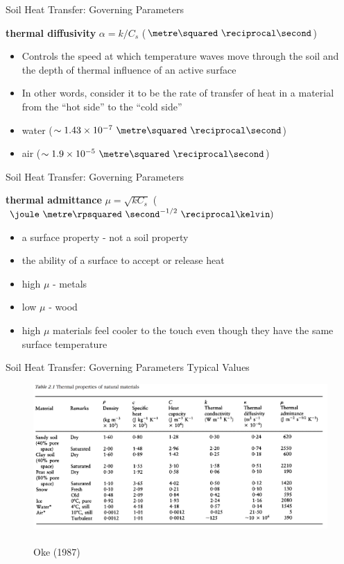 \begin{frame}{Soil Heat Transfer: Governing Parameters}

{\large \textbf{thermal diffusivity } $\alpha = k/C_s$ ($\metre\squared\ \reciprocal\second$})
\begin{itemize}
	\item Controls the speed at which temperature waves move through the soil and the depth of thermal influence of an active surface
	\item In other words, consider it to be the rate of transfer of heat in a material from the ``hot side'' to the ``cold side''
	\item water ($\sim 1.43\times 10^{-7}\ \metre\squared\ \reciprocal\second$)
	\item air ($\sim 1.9\times 10^{-5}\ \metre\squared\ \reciprocal\second$)
\end{itemize}
\end{frame}


\begin{frame}{Soil Heat Transfer: Governing Parameters}

{\large \textbf{thermal admittance } $\mu = \sqrt{kC_s}$ ($\joule\ \metre\rpsquared\ \second^{-1/2}\ \reciprocal\kelvin)$}
\begin{itemize}
	\item a surface property - not a soil property
	\item the ability of a surface to accept or release heat
	\item high $\mu$ - metals
	\item low $\mu$ - wood
	\item high $\mu$ materials feel cooler to the touch even though they have the same surface temperature
\end{itemize}
\end{frame}


\begin{frame}{Soil Heat Transfer: Governing Parameters Typical Values}

\begin{figure}
\includegraphics[width=\textwidth]{fig6}
\centering \tiny~\\Oke (1987)
\end{figure}
\end{frame}

